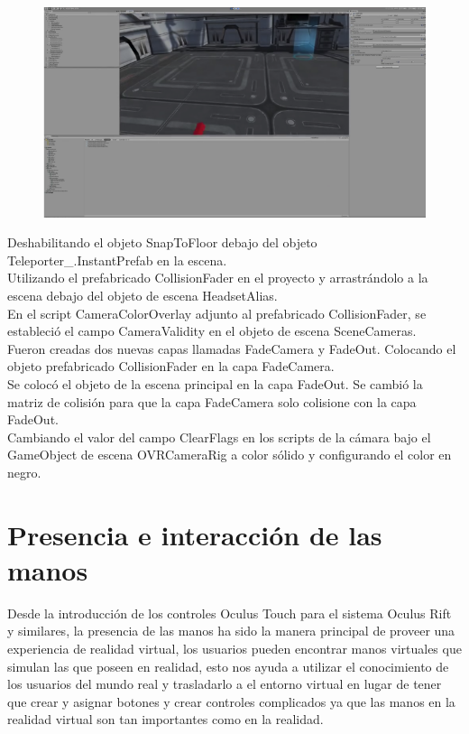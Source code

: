 \begin{figure}[H]
	\begin{center}
 		\includegraphics[width = .5\textwidth]{source/images/image71.png}
	\end{center} 
\end{figure}

Deshabilitando el objeto SnapToFloor debajo del objeto Teleporter\_.InstantPrefab en la escena.\\

Utilizando el prefabricado CollisionFader en el proyecto y arrastrándolo a la escena debajo del objeto de escena HeadsetAlias.\\

En el script CameraColorOverlay adjunto al prefabricado CollisionFader, se estableció el campo CameraValidity en el objeto de escena SceneCameras.\\

Fueron creadas dos nuevas capas llamadas FadeCamera y FadeOut. Colocando el objeto prefabricado CollisionFader en la capa FadeCamera.\\

Se colocó el objeto de la escena principal en la capa FadeOut. Se cambió la matriz de colisión para que la capa FadeCamera solo colisione con la capa FadeOut.\\

Cambiando el valor del campo ClearFlags en los scripts de la cámara bajo el GameObject de escena OVRCameraRig a color sólido y configurando el color en negro.\\

\section{Presencia e interacción de las manos}
Desde la introducción de los controles Oculus Touch para el sistema Oculus Rift y similares, la presencia de las manos ha sido la manera principal de proveer una experiencia de realidad virtual, los usuarios pueden encontrar manos virtuales que simulan las que poseen en realidad, esto nos ayuda a utilizar el conocimiento de los usuarios del mundo real y trasladarlo a el entorno virtual en lugar de tener que crear y asignar botones y crear controles complicados ya que las manos en la realidad virtual son tan importantes como en la realidad.\\


